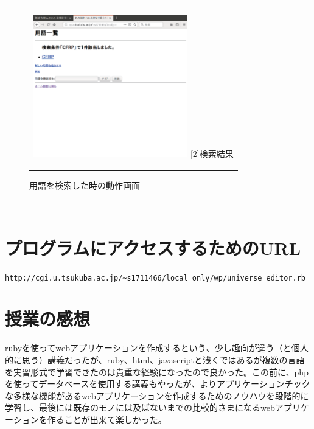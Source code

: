 \documentclass[12pt,a4paper]{jarticle}
\begin{document}
\begin{ttfamily}
\begin{figure}[htbp]
\begin{center}
\begin{tabular}{c}
      \begin{minipage}{0.55\hsize}
        \begin{center}
          \includegraphics[width=6.7cm]{10-3-42.eps}
          \hspace{1.6cm} [2]検索結果
        \end{center}
      \end{minipage}

    \end{tabular}
    \caption{用語を検索した時の動作画面}
    \label{fig:b}
  \end{center}
\end{figure}

\newpage
\ \\
\newpage
\newpage
\newpage
\newpage
\section{プログラムにアクセスするためのURL}
\verb|http://cgi.u.tsukuba.ac.jp/~s1711466/local_only/wp/universe_editor.rb|

\section{授業の感想}
rubyを使ってwebアプリケーションを作成するという、少し趣向が違う（と個人的に思う）講義だったが、ruby、html、javascriptと浅くではあるが複数の言語を実習形式で学習できたのは貴重な経験になったので良かった。この前に、phpを使ってデータベースを使用する講義もやったが、よりアプリケーションチックな多様な機能があるwebアプリケーションを作成するためのノウハウを段階的に学習し、最後には既存のモノには及ばないまでの比較的さまになるwebアプリケーションを作ることが出来て楽しかった。


\end{ttfamily}
\end{document}
